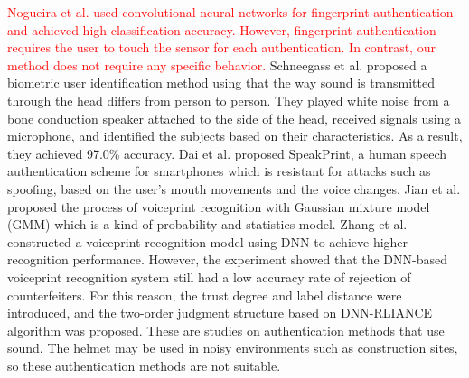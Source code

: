 \documentclass[english,preprint,JIP]{ipsj}
\begin{document}
\textcolor{red}{Nogueira et al.\cite{finger_CNN} used convolutional neural networks for fingerprint authentication and achieved high classification accuracy. However, fingerprint authentication requires the user to touch the sensor for each authentication. In contrast, our method does not require any specific behavior.}
Schneegass et al.\cite{skull_auth} proposed a biometric user identification method using that the way sound is transmitted through the head differs from person to person. They played white noise from a bone conduction speaker attached to the side of the head, received signals using a microphone, and identified the subjects based on their characteristics. As a result, they achieved 97.0\% accuracy. Dai et al.\cite{speech_auth} proposed SpeakPrint, a human speech authentication scheme for smartphones which is resistant for attacks such as spoofing, based on the user's mouth movements and the voice changes. Jian et al.\cite{voice_auth_GMM} proposed the process of voiceprint recognition with Gaussian mixture model (GMM) which is a kind of probability and statistics model. Zhang et al.\cite{voice_auth_DNN} constructed a voiceprint recognition model using DNN to achieve higher recognition performance. However, the experiment showed that the DNN-based voiceprint recognition system still had a low accuracy rate of rejection of counterfeiters. For this reason, the trust degree and label distance were introduced, and the two-order judgment structure based on DNN-RLIANCE algorithm was proposed. These are studies on authentication methods that use sound. The helmet may be used in noisy environments such as construction sites, so these authentication methods are not suitable.\par

\end{document}
